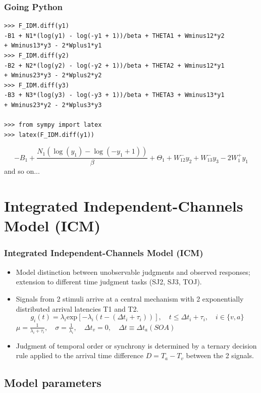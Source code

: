 \documentclass[xcolor={fixpdftex,hyperref,x11names},10pt,pdftex,hyperref={pdftex}]{beamer}
\begin{document}
\begin{frame}[fragile]
  \frametitle{Going Python}
  \begin{verbatim}
>>> F_IDM.diff(y1)
-B1 + N1*(log(y1) - log(-y1 + 1))/beta + THETA1 + Wminus12*y2
+ Wminus13*y3 - 2*Wplus1*y1
>>> F_IDM.diff(y2)
-B2 + N2*(log(y2) - log(-y2 + 1))/beta + THETA2 + Wminus12*y1
+ Wminus23*y3 - 2*Wplus2*y2
>>> F_IDM.diff(y3)
-B3 + N3*(log(y3) - log(-y3 + 1))/beta + THETA3 + Wminus13*y1
+ Wminus23*y2 - 2*Wplus3*y3

>>> from sympy import latex
>>> latex(F_IDM.diff(y1))
  \end{verbatim}
$$- B_{1} + \frac{N_{1} (\operatorname{log}(y_{1}) -
\operatorname{log}(- y_{1} + 1))}{\beta} + \Theta_{1} +
W^-_{12} y_{2} + W^-_{13} y_{3} - 2 W^+_{1} y_{1}$$
and so on...
\end{frame}


\section{Integrated Independent-Channels Model (ICM)}
\label{sec:icm}

\begin{frame}
  \frametitle{Integrated Independent-Channels Model (ICM)}
  \begin{itemize}
   \item  Model distinction between unobservable judgments and
   observed responses; extension to different time judgment tasks (SJ2, SJ3, TOJ).  
   \item  Signals from 2 stimuli arrive at a central mechanism with 2
    exponentially distributed arrival latencies T1 and T2.
   \newline
  \begin{equation}
   g_i(t) = \lambda_i \text{exp}[-\lambda_i(t-(\Delta t_i + \tau_i ))],
   \quad t \leq \Delta t_i + \tau_i,\quad  i\in\{v,a\}
  \end{equation}
   \newline
   $\mu = \frac{1}{\lambda_i+\tau_i},\quad\sigma = \frac{1}{\lambda_i},
   \quad \Delta t_v=0, \quad\Delta t\equiv\Delta t_a (SOA) $
   \newline
   \item  Judgment of temporal order or synchrony is determined by
   a ternary decision rule applied to the arrival time
   difference $D=T_a-T_v$ between the 2 signals.
 \end{itemize}
\end{frame}

\subsection{Model parameters}
\end{document}
